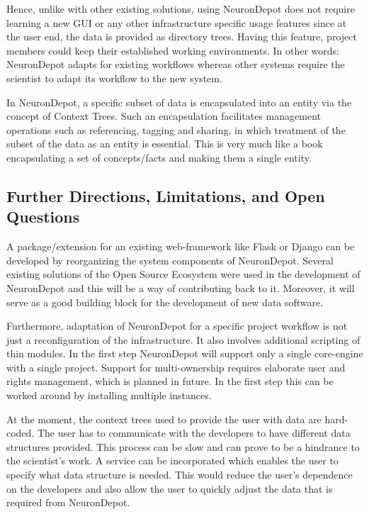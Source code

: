 \documentclass{frontiersSCNS} %
\begin{document}
Hence, unlike with other existing solutions, using NeuronDepot does not require
learning a new GUI or any other infrastructure specific usage features since at
the user end, the data is provided as directory trees. Having this feature,
project members could keep their established working environments. In other
words: NeuronDepot adapts for existing workflows whereas other systems require
the scientist to adapt its workflow to the new system.

In NeuronDepot, a specific subset of data is encapsulated into an entity via
the concept of Context Trees. Such an encapsulation facilitates management
operations such as referencing, tagging and sharing, in which treatment of the
subset of the data as an entity is essential. This is very much like a book
encapsulating a set of concepts/facts and making them a single entity.

\subsection{Further Directions, Limitations, and Open Questions}

A package/extension for an existing web-framework like Flask or Django can be
developed by reorganizing the system components of NeuronDepot. Several
existing solutions of the Open Source Ecosystem were used in the development of
NeuronDepot and this will be a way of contributing back to it. Moreover, it
will serve as a good building block for the development of new data software.

Furthermore, adaptation of NeuronDepot for a specific project workflow is not
just a reconfiguration of the infrastructure. It also involves additional
scripting of thin modules. In the first step NeuronDepot will support only a
single core-engine with a single project. Support for multi-ownership
requires elaborate user and rights management, which is planned in future. In
the first step this can be worked around by installing multiple instances.

At the moment, the context trees used to provide the user with data are
hard-coded. The user has to communicate with the developers to have different
data structures provided. This process can be slow and can prove to be a
hindrance to the scientist's work. A service can be incorporated which enables
the user to specify what data structure is needed. This would reduce the user's
dependence on the developers and also allow the user to quickly adjust the data
that is required from NeuronDepot.
\end{document}
